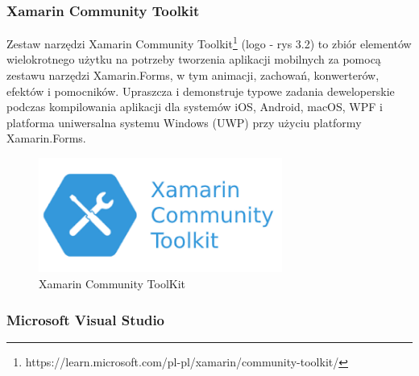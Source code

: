 \subsubsection{Xamarin Community Toolkit}

Zestaw narzędzi Xamarin Community Toolkit\footnote{https://learn.microsoft.com/pl-pl/xamarin/community-toolkit/\cite{www2}} (logo - rys 3.2) to zbiór elementów wielokrotnego użytku na potrzeby tworzenia aplikacji mobilnych za pomocą zestawu narzędzi Xamarin.Forms, w tym animacji, zachowań, konwerterów, efektów i pomocników. Upraszcza i demonstruje typowe zadania deweloperskie podczas kompilowania aplikacji dla systemów iOS, Android, macOS, WPF i platforma uniwersalna systemu Windows (UWP) przy użyciu platformy Xamarin.Forms.

	\begin{figure}[!htb]
	\begin{center}
		\includegraphics[width=8cm]{rys/xtools.png}
		\caption{Xamarin Community ToolKit}
		\label{rys:rysunek001}
	\end{center}
\end{figure}

\subsubsection{Microsoft Visual Studio}

